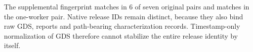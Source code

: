 The supplemental fingerprint matches in 6 of seven
original pairs and matches in the one-worker pair. Native release IDs
remain distinct, because they also bind raw GDS, reports and path-bearing
characterization records. Timestamp-only normalization of GDS therefore cannot
stabilize the entire release identity by itself.
